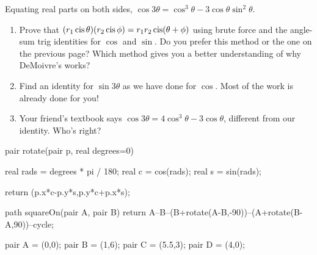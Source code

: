\documentclass[../gatm.tex]{subfiles}
\begin{document}
\noindent Equating real parts on both sides, $\cos 3\theta = \cos^3\theta - 3\cos\theta\sin^2\theta$.

\begin{enumerate}
\setcounter{enumi}{\value{cg_problem_i}}
\item Prove that $(r_1\operatorname{cis} \theta)(r_2\operatorname{cis} \phi) = r_1r_2 \operatorname{cis}(\theta + \phi)$ using brute force and the angle-sum trig identities for $\cos$ and $\sin$. Do you prefer this method or the one on the previous page? Which method gives you a better understanding of why DeMoivre's works?
\item Find an identity for $\sin 3\theta$ as we have done for $\cos$. Most of the work is already done for you!
\item Your friend's textbook says $\cos 3\theta = 4\cos^3\theta - 3\cos \theta$, different from our identity. Who's right?

\setcounter{cg_problem_i}{\value{enumi}}
\end{enumerate}

\begin{asydef}
pair rotate(pair p, real degrees=0) {
	real rads = degrees * pi / 180;
	real c = cos(rads);
	real s = sin(rads);

	return (p.x*c-p.y*s,p.y*c+p.x*s);
}

path squareOn(pair A, pair B) {
	return A--B--(B+rotate(A-B,-90))--(A+rotate(B-A,90))--cycle;
}

pair A = (0,0);
pair B = (1,6);
pair C = (5.5,3);
pair D = (4,0);

\end{asydef}
\end{document}
